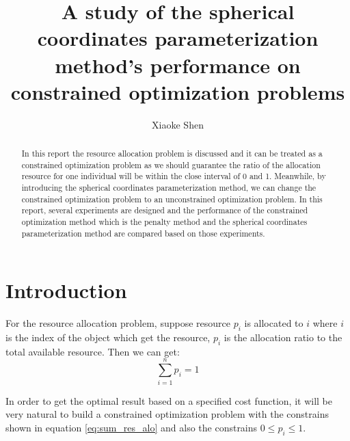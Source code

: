 \documentclass[a4paper,12pt]{article}
\title {A study of the spherical coordinates parameterization method's performance on constrained optimization problems}
\author{Xiaoke Shen}
\affil{the Graduate Center, the City University of New York}
\date{}
\begin{document}
\maketitle

\begin{abstract}
In this report the resource allocation problem is discussed and it can be treated as a constrained optimization problem as we should guarantee the ratio of the allocation resource for one individual will be within the close interval of 0 and 1. Meanwhile, by introducing the spherical coordinates parameterization method, we can change the constrained optimization problem  to an unconstrained optimization problem. In this report, several experiments are designed and the performance of the constrained optimization method which is the penalty method and the spherical coordinates parameterization method are compared based on those experiments.
\end{abstract}
\section{Introduction}
For the resource allocation problem, suppose resource $p_i$ is allocated to $i$ where $i$ is the index of the object which get the resource, $p_i$ is the allocation ratio to the total available resource. Then we can get:\\
\begin{equation} \label{eq:sum_res_alo}
\sum_{i=1}^{n} p_i = 1
\end{equation}

In order to get the optimal result based on a specified cost function, it will be very natural to build a constrained optimization problem with the constrains shown in equation \ref{eq:sum_res_alo} and also the constrains $0 \leq p_i \leq 1$.\\
\end{document}

